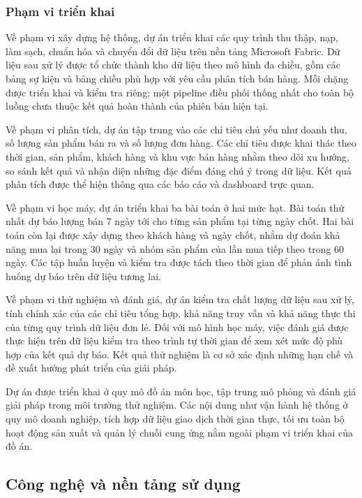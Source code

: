 \subsubsection{Phạm vi triển khai}

Về phạm vi xây dựng hệ thống, dự án triển khai các quy trình thu thập, nạp, làm sạch, chuẩn hóa và chuyển đổi dữ liệu trên nền tảng Microsoft Fabric. Dữ liệu sau xử lý được tổ chức thành kho dữ liệu theo mô hình đa chiều, gồm các bảng sự kiện và bảng chiều phù hợp với yêu cầu phân tích bán hàng. Mỗi chặng được triển khai và kiểm tra riêng; một pipeline điều phối thống nhất cho toàn bộ luồng chưa thuộc kết quả hoàn thành của phiên bản hiện tại.

Về phạm vi phân tích, dự án tập trung vào các chỉ tiêu chủ yếu như doanh thu, số lượng sản phẩm bán ra và số lượng đơn hàng. Các chỉ tiêu được khai thác theo thời gian, sản phẩm, khách hàng và khu vực bán hàng nhằm theo dõi xu hướng, so sánh kết quả và nhận diện những đặc điểm đáng chú ý trong dữ liệu. Kết quả phân tích được thể hiện thông qua các báo cáo và dashboard trực quan.

Về phạm vi học máy, dự án triển khai ba bài toán ở hai mức hạt. Bài toán thứ nhất dự báo lượng bán 7 ngày tới cho từng sản phẩm tại từng ngày chốt. Hai bài toán còn lại được xây dựng theo khách hàng và ngày chốt, nhằm dự đoán khả năng mua lại trong 30 ngày và nhóm sản phẩm của lần mua tiếp theo trong 60 ngày. Các tập huấn luyện và kiểm tra được tách theo thời gian để phản ánh tình huống dự báo trên dữ liệu tương lai.

Về phạm vi thử nghiệm và đánh giá, dự án kiểm tra chất lượng dữ liệu sau xử lý, tính chính xác của các chỉ tiêu tổng hợp, khả năng truy vấn và khả năng thực thi của từng quy trình dữ liệu đơn lẻ. Đối với mô hình học máy, việc đánh giá được thực hiện trên dữ liệu kiểm tra theo trình tự thời gian để xem xét mức độ phù hợp của kết quả dự báo. Kết quả thử nghiệm là cơ sở xác định những hạn chế và đề xuất hướng phát triển của giải pháp.

Dự án được triển khai ở quy mô đồ án môn học, tập trung mô phỏng và đánh giá giải pháp trong môi trường thử nghiệm. Các nội dung như vận hành hệ thống ở quy mô doanh nghiệp, tích hợp dữ liệu giao dịch thời gian thực, tối ưu toàn bộ hoạt động sản xuất và quản lý chuỗi cung ứng nằm ngoài phạm vi triển khai của đồ án.

\subsection{Công nghệ và nền tảng sử dụng}

